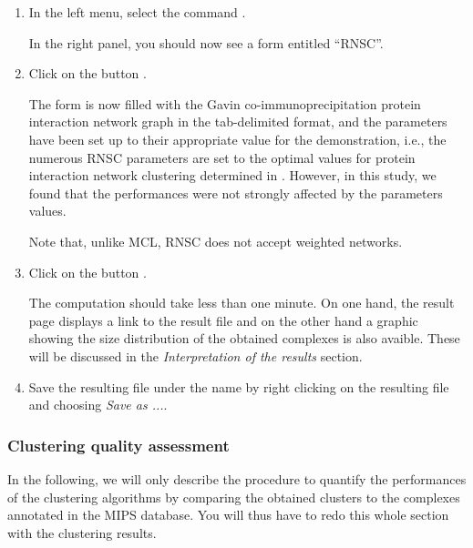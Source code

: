 \begin{enumerate}

\item In the \neat left menu, select the command . 

  In the right panel, you should now see a form entitled
  ``RNSC''.

\item Click on the button . 

  The form is now filled with the Gavin co-immunoprecipitation protein interaction network graph in the tab-delimited format, and the parameters have been set up to their appropriate value for the demonstration, i.e., the numerous RNSC parameters are set to the optimal values for  protein interaction network clustering determined in \cite{Brohee2006}. However, in this study, we found that the  performances were not strongly affected by the parameters values.
  
  Note that, unlike MCL, RNSC does not accept weighted networks.

\item Click on the button . 

  The computation should take less than one minute. 
  On one hand, the result page displays a link to the result file and on the other hand a graphic showing the size distribution of the obtained complexes is also avaible. These will be discussed in the \textit{Interpretation of the results} section. 
  
\item Save the resulting file under the name  by right clicking on the resulting file and choosing \textit{Save as ...}.

\end{enumerate}
\subsubsection{Clustering quality assessment}
In the following, we will only describe the procedure to quantify the performances of 
the clustering algorithms by comparing the  obtained clusters to the 
complexes annotated in the MIPS database.
You will thus have to redo this whole section with the  clustering results.

